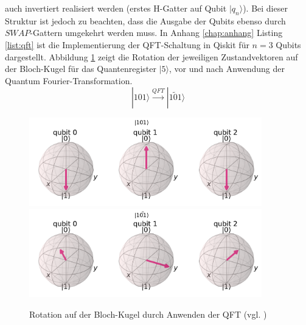 auch invertiert realisiert werden (erstes H-Gatter auf Qubit $|q_n\rangle$). Bei dieser Struktur ist jedoch zu beachten, dass die Ausgabe der Qubits ebenso durch $SWAP$-Gattern umgekehrt werden muss.
In Anhang \ref{chap:anhang} Listing \ref{list:qft} ist die Implementierung der QFT-Schaltung in Qiskit f\"ur $n=3$ Qubits dargestellt. Abbildung \ref{fig:QFT-Bloch} zeigt die Rotation der jeweiligen Zustandvektoren auf der Bloch-Kugel f\"ur das Quantenregister $|5\rangle$, vor und nach Anwendung der Quantum Fourier-Transformation.
\begin{equation}
|101\rangle \xrightarrow{QFT} |\tilde{101}\rangle
\end{equation}

\begin{figure}[h]
\centering
\includegraphics[width=0.9\textwidth]{figures/qft_init.pdf}
\bigbreak
\includegraphics[width=0.9\textwidth]{figures/qft_applied.pdf}
\caption{Rotation auf der Bloch-Kugel durch Anwenden der QFT (vgl. \cite{Qiskit-Textbook})}
\label{fig:QFT-Bloch}
\end{figure}

